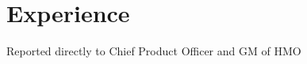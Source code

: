 \documentclass[a4paper]{deedy-resume-openfont} %
\begin{document}
\begin{minipage}[t]{0.66\textwidth} %

\section{Experience}

\vspace{\topsep} %
\begin{tightitemize}
	\item Reported directly to Chief Product Officer and GM of HMO
    \item 
\end{tightitemize}


\end{minipage}
\end{document}
